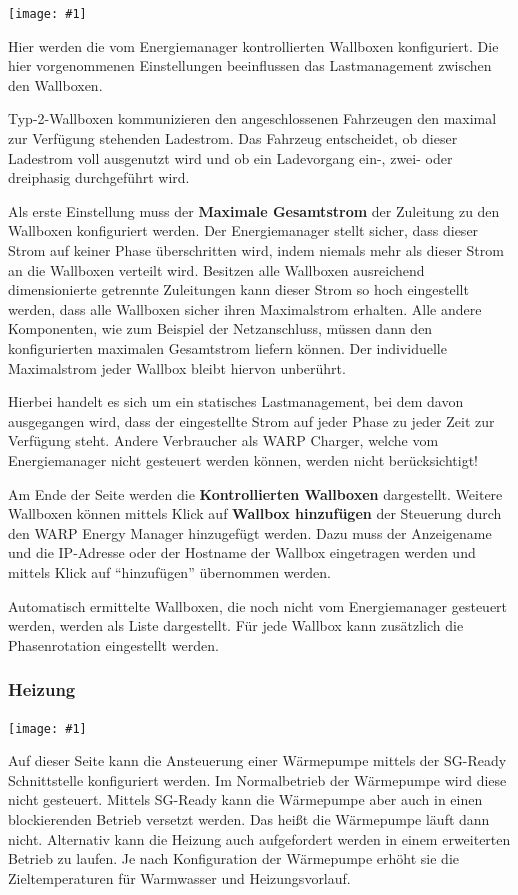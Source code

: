 \documentclass[a4paper,10pt]{article}
\newcommand{\hint}[1]{\begin{tcolorbox}[colback=boxgray,colframe=black,coltext=
white,title=Hinweis,left*=2mm,right*=2mm,boxsep=1mm,bottom=1mm,top=1mm]#1\end{tcolorbox}}
\newcommand{\gfx}[1]{\texttt{[image: \#1]}}
\begin{document}
\begin{multicols*}{2}
	\gfx{./img_v2/wem2-web-wallbox}

	Hier werden die vom Energiemanager kontrollierten Wallboxen konfiguriert.
	Die hier vorgenommenen Einstellungen beeinflussen das Lastmanagement
	zwischen den Wallboxen.

	Typ-2-Wallboxen kommunizieren den angeschlossenen Fahrzeugen den maximal zur
	Verfügung stehenden Ladestrom. Das Fahrzeug entscheidet, ob dieser Ladestrom
	voll ausgenutzt wird und ob ein Ladevorgang ein-, zwei- oder dreiphasig durchgeführt
	wird.

	Als erste Einstellung muss der \textbf{Maximale Gesamtstrom}
	der Zuleitung zu den Wallboxen konfiguriert werden.
	Der Energiemanager stellt sicher, dass dieser
	Strom auf keiner Phase überschritten wird, indem niemals mehr als
	dieser Strom an die Wallboxen verteilt wird. Besitzen alle Wallboxen
	ausreichend dimensionierte getrennte Zuleitungen kann dieser Strom so
	hoch eingestellt werden, dass alle Wallboxen sicher ihren Maximalstrom
	erhalten. Alle andere Komponenten, wie zum Beispiel der Netzanschluss,
	müssen dann den konfigurierten maximalen Gesamtstrom liefern können.
	Der individuelle Maximalstrom jeder Wallbox bleibt hiervon unberührt.

	\hint{Hierbei handelt es sich um ein statisches Lastmanagement, bei dem
	davon ausgegangen wird, dass der eingestellte Strom auf jeder Phase
	zu jeder Zeit zur Verfügung steht. Andere Verbraucher als WARP Charger,
	welche vom Energiemanager nicht gesteuert werden können, werden nicht
	berücksichtigt!}

	Am Ende der Seite werden die \textbf{Kontrollierten
	Wallboxen} dargestellt. Weitere Wallboxen können mittels Klick auf
	\textbf{Wallbox hinzufügen} der Steuerung durch den WARP Energy Manager
	hinzugefügt werden. Dazu muss der Anzeigename und die IP-Adresse oder der
	Hostname der Wallbox eingetragen werden und mittels Klick auf \enquote{hinzufügen} übernommen werden.

	Automatisch ermittelte Wallboxen, die noch nicht vom Energiemanager
	gesteuert werden, werden als Liste dargestellt. Für jede Wallbox kann zusätzlich
    die Phasenrotation eingestellt werden.

    \subsubsection{Heizung}

	\gfx{./img_v2/wem2-web-heater}

    Auf dieser Seite kann die Ansteuerung einer Wärmepumpe mittels der SG-Ready Schnittstelle konfiguriert werden. Im Normalbetrieb der Wärmepumpe wird diese nicht gesteuert. 
    Mittels SG-Ready kann die Wärmepumpe aber auch in einen blockierenden Betrieb versetzt werden. Das heißt die Wärmepumpe läuft dann nicht.
    Alternativ kann die Heizung auch aufgefordert werden in einem erweiterten Betrieb zu laufen. Je nach Konfiguration der Wärmepumpe erhöht sie die Zieltemperaturen für Warmwasser und Heizungsvorlauf.
        

\end{multicols*}
\end{document}
